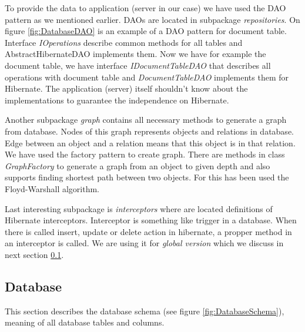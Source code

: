 To provide the data to application (server in our case) we have used the DAO pattern
as we mentioned earlier. DAOs are located in subpackage \emph{repositories}. On figure
\ref{fig:DatabaseDAO} is an example of a DAO pattern for document table. Interface
\emph{IOperations} describe common methods for all tables and AbstractHibernateDAO
implements them. Now we have for example the document table, we have interface
\emph{IDocumentTableDAO} that describes all operations with document table and
\emph{DocumentTableDAO} implements them for Hibernate. The application (server)
itself shouldn't know about the implementations to guarantee the independence
on Hibernate.

Another subpackage \emph{graph} contains all necessary methods to generate a graph
from database. Nodes of this graph represents objects and relations in database.
Edge between an object and a relation means that this object is in that relation.
We have used the factory pattern to create graph. There are methods in class
\emph{GraphFactory} to generate a graph from an object to given depth and also
supports finding shortest path between two objects. For this has been used the Floyd-Warshall
algorithm. 


Last interesting subpackage is \emph{interceptors} where are located definitions
of Hibernate interceptors. Interceptor is something like trigger in a database.
When there is called insert, update or delete action in hibernate, a propper method
in an interceptor is called. We are using it for \emph{global version} which we
discuss in next section \ref{sec:Database}.

\subsection{Database}
\label{sec:Database}

This section describes the database schema (see figure \ref{fig:DatabaseSchema}), meaning of all database tables and columns.


